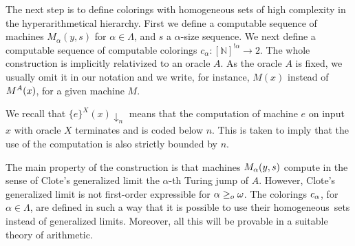 \documentclass[11pt]{amsart}
\newtheorem{proposition}[thm]{Proposition}
\theoremstyle{definition}
\theoremstyle{remark}
\theoremstyle{plain}
\newcommand{\numberset}{\mathbb}
\newcommand{\N}{\numberset{N}}
\def\a{\alpha}
\newcommand{\RCA}{\mathsf{RCA}_0}
\newcommand{\set}[1]{{\{{#1}\}}}
\def\stops{{\downarrow}}
\def\notstops{{\uparrow}}
\def\WO{{\textrm{WO}}}
\newcommand{\leo}{<\sb{o}}
\newcommand{\geqo}{\geq\sb{o}}
\def\N{{\mathbb{N}}}
\def\stops{{\downarrow}}
\def\notstops{{\uparrow}}
\newcommand{\homo}{homogeneous}
\newcommand{\isfunc}[3]{{{#1}\colon{#2}\rightarrow{#3}}}
\begin{document}

%
%

The next step is to define colorings with homogeneous sets of high complexity in the hyperarithmetical hierarchy.
First we define a computable sequence of machines $M_\alpha(y,s)$ for $\a \in \Lambda$, and $s$ a $\alpha$-size sequence. 
We next define a computable sequence of computable colorings $\isfunc{c_\alpha}{[\N]^{!\alpha}}{2}$.
The whole construction is implicitly relativized to an oracle $A$. 
As the oracle $A$ is fixed, we usually omit it in our notation and we write, for instance, $M(x)$ instead of $M\sp A(x)$, for a given machine $M$.

We recall that $\{e\}^X(x)\stops_n$ means that the computation of machine $e$ on input $x$ with oracle $X$ terminates and is coded below $n$. 
This is taken to imply that the use of the computation is also strictly bounded by $n$.

The main property of the construction is that machines $M\sb\alpha(y,s)$ compute in the sense of  Clote's generalized limit \cite{clote1986generalization} the $\alpha$-th Turing jump of $A$. 
However, Clote's generalized limit is not first-order expressible for $\alpha\geqo \omega$. 
The colorings $c\sb\alpha$, for $\alpha\in\Lambda$, are defined in such a way that it is possible to use their \homo\ sets instead of generalized limits. 
Moreover, all this will be provable in a suitable theory of arithmetic.
\end{document}
